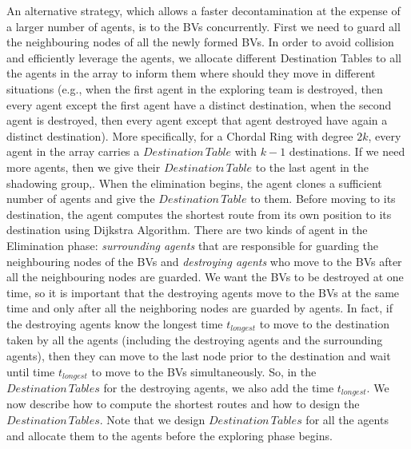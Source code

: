 An alternative strategy, which allows a faster decontamination at the expense of a larger number of agents, is to  the BVs concurrently. First we need to guard all the neighbouring nodes of all the newly formed BVs. In order to avoid collision and efficiently leverage the agents, we allocate different Destination Tables to all the agents in the array to inform them where should they   move in different situations (e.g., when the first agent in the exploring team is destroyed, then every agent except the first agent have a distinct destination, when the second agent is destroyed, then every agent except that agent destroyed have again a distinct destination). More specifically, for a Chordal Ring with   degree $2k$, every agent in the array carries a $Destination\,Table$ with $k-1$ destinations. If we need more agents, then we   give their $Destination\,Table$ to the last agent in the shadowing group,. When the elimination begins, the agent clones a sufficient  number of agents and give   the    $Destination\, Table$ to them. 
Before moving to its destination, the agent computes the shortest route from its own position to its destination using Dijkstra Algorithm. There are two kinds of agent in the Elimination phase: {\em surrounding agents} that are responsible for guarding the neighbouring nodes of the BVs and {\em destroying agents} who move to the BVs after all the neighbouring nodes are guarded. We want the BVs to be destroyed at one time, so it is important that the destroying agents move to the BVs at the same time and only after all the neighboring nodes are guarded by agents. In fact, if the destroying agents know the longest time $t_{longest}$ to move to the destination taken by all the agents (including the destroying agents and the surrounding agents), then they can move to the last node prior to the destination and wait until time  $t_{longest}$ to move to the BVs simultaneously. So,  in the $Destination\,Tables$ for the destroying agents, we also add  the time   $t_{longest}$. We now  describe how to compute the shortest routes and how to design the $Destination\,Tables$. Note that we design $Destination\,Tables$ for all the agents and allocate them to the agents before the exploring phase begins.

